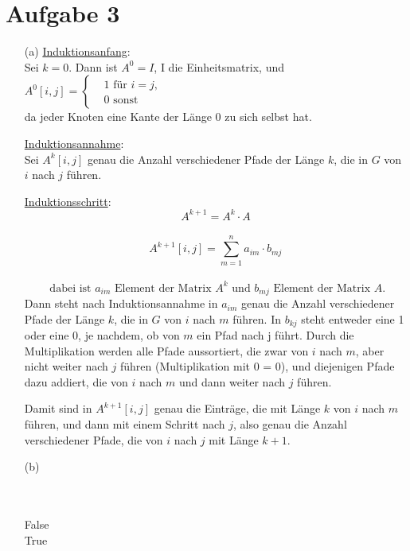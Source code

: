 \documentclass{scrartcl}
\begin{document}
 

\section{Aufgabe 3}

\begin{enumerate} 
\item[(a)] 
\underline{Induktionsanfang}: \\
Sei $k=0$. Dann ist $A^0=I$, I die Einheitsmatrix, und \\
$A^0[i,j]= \begin{cases} &1 \text{ für } i=j, \\
			&0 \text{ sonst } \end{cases}$ \\ 
da jeder Knoten eine Kante der Länge 0 zu sich selbst hat.

\underline{Induktionsannahme}: \\
Sei $A^k[i,j]$ genau die Anzahl verschiedener Pfade der Länge $k$, 
die in $G$ von $i$ nach $j$ führen. 

\underline{Induktionsschritt}: \\
\[ 
A^{k+1} =A^k \cdot A \] \\ 
\[
A^{k+1}[i,j] = \sum_{m=1}^n a_{im} \cdot b_{mj} \] \\ \[
\text{ dabei ist } a_{im} \text{ Element der Matrix } A^k 
\text{ und } b_{mj} \text{ Element der Matrix } A. 
\] 
Dann steht nach Induktionsannahme in $a_{im}$ genau die Anzahl 
verschiedener Pfade der Länge $k$, die in $G$ von $i$ nach $m$ führen.
In $b_{kj}$ steht entweder eine 1 oder eine 0, je nachdem, ob von $m$ ein 
Pfad nach j führt. Durch die Multiplikation werden alle Pfade 
aussortiert, die zwar von $i$ nach $m$, aber nicht weiter nach $j$ führen 
(Multiplikation mit 0 = 0), und diejenigen Pfade dazu addiert, die von 
$i$ nach $m$ und dann weiter nach $j$ führen. 

Damit sind in $A^{k+1}[i,j]$ genau die Einträge, die mit Länge $k$ von 
$i$ nach $m$ führen, und dann mit einem Schritt nach $j$, also genau 
die Anzahl verschiedener Pfade, die von $i$ nach $j$ mit Länge $k+1$.


\item[(b)] 
\begin{algorithm}
\begin{algorithmic}
\\
\\
\Return False
\EndIf
\EndFor \\
\Return True 
\EndFunction
\end{algorithmic}
\end{algorithm}



\end{enumerate}
\end{document}
